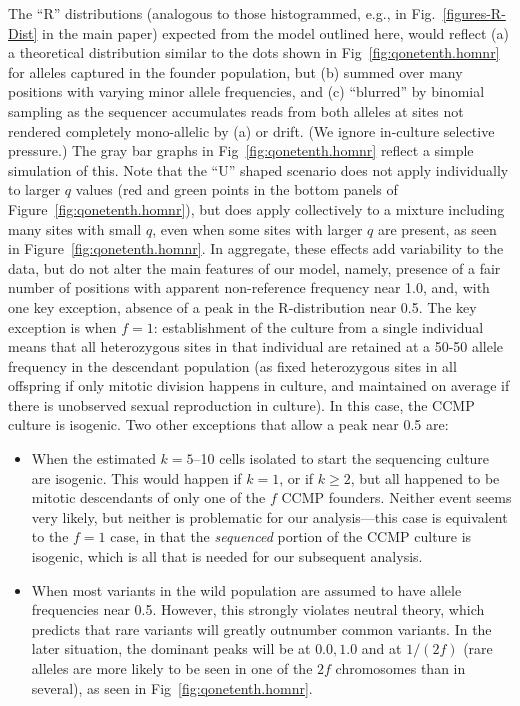 \documentclass{article}\usepackage[]{graphicx}\usepackage[]{color}
\begin{document}
The ``R'' distributions (analogous to those histogrammed, e.g., in Fig.~\ref{figures-R-Dist} in the main paper) expected from the model outlined here, would reflect (a) a theoretical distribution similar to the dots shown in Fig~\ref{fig:qonetenth.homnr} for alleles captured in the founder population, but (b) summed over many positions with varying minor allele frequencies, and (c) ``blurred'' by binomial sampling as the sequencer accumulates reads from both alleles at sites not rendered completely mono-allelic by (a) or drift.  
(We ignore in-culture selective pressure.)  
The gray bar graphs in Fig~\ref{fig:qonetenth.homnr} reflect a simple simulation of this.  
Note that the ``U'' shaped scenario does not apply individually to larger $q$ values (red and green points in the bottom panels of Figure~\ref{fig:qonetenth.homnr}), but does apply collectively to a mixture including many sites with small $q$, even when some sites with larger $q$ are present, as seen in Figure~\ref{fig:qonetenth.homnr}.
In aggregate, these effects add variability to the data, but do not alter the main features of our model, namely, presence of a fair number of positions with apparent non-reference frequency near 1.0, and, with one key exception, absence of a peak in the R-distribution near 0.5.
The key exception is when $f=1$: establishment of the culture from a single individual means that all heterozygous sites in that individual are retained at a 50-50 allele frequency in the descendant population (as fixed heterozygous sites in all offspring if only mitotic division happens in culture, and maintained on average if there is unobserved sexual reproduction in culture).
In this case, the CCMP culture is isogenic.
Two other exceptions that allow a peak near 0.5 are:
\begin{itemize}
  \item When the estimated $k=5$--10 cells isolated to start the sequencing culture are isogenic.  This would happen if $k=1$, or if $k \ge 2$, but all happened to be mitotic descendants of only one of the $f$ CCMP founders.  Neither event seems very likely, but neither is problematic for our analysis---this case is equivalent to the $f=1$ case, in that the \emph{sequenced} portion of the CCMP culture is isogenic, which is all that is needed for our subsequent analysis.
  \item When most variants in the wild population are assumed to have allele frequencies near 0.5.  However, this strongly violates neutral theory, which predicts that rare variants will greatly outnumber common variants.  In the later situation, the dominant peaks will be at $0.0, 1.0$ and at $1/(2f)$ (rare alleles are more likely to be seen in one of the $2f$ chromosomes than in several), as seen in Fig~\ref{fig:qonetenth.homnr}.
\end{itemize}
\end{document}
